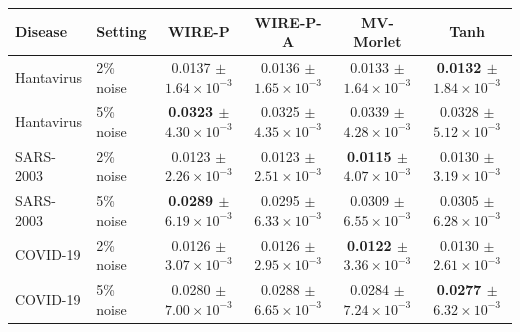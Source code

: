 \begin{tabular}{llcccc}
\toprule
Disease & Setting & WIRE-P & WIRE-P-A & MV-Morlet & Tanh \\
\midrule
Hantavirus & 2\% noise & 0.0137 $\pm$ $1.64\times10^{-3}$ & 0.0136 $\pm$ $1.65\times10^{-3}$ & 0.0133 $\pm$ $1.64\times10^{-3}$ & \textbf{0.0132 $\pm$ $1.84\times10^{-3}$} \\
Hantavirus & 5\% noise & \textbf{0.0323 $\pm$ $4.30\times10^{-3}$} & 0.0325 $\pm$ $4.35\times10^{-3}$ & 0.0339 $\pm$ $4.28\times10^{-3}$ & 0.0328 $\pm$ $5.12\times10^{-3}$ \\
SARS-2003 & 2\% noise & 0.0123 $\pm$ $2.26\times10^{-3}$ & 0.0123 $\pm$ $2.51\times10^{-3}$ & \textbf{0.0115 $\pm$ $4.07\times10^{-3}$} & 0.0130 $\pm$ $3.19\times10^{-3}$ \\
SARS-2003 & 5\% noise & \textbf{0.0289 $\pm$ $6.19\times10^{-3}$} & 0.0295 $\pm$ $6.33\times10^{-3}$ & 0.0309 $\pm$ $6.55\times10^{-3}$ & 0.0305 $\pm$ $6.28\times10^{-3}$ \\
COVID-19 & 2\% noise & 0.0126 $\pm$ $3.07\times10^{-3}$ & 0.0126 $\pm$ $2.95\times10^{-3}$ & \textbf{0.0122 $\pm$ $3.36\times10^{-3}$} & 0.0130 $\pm$ $2.61\times10^{-3}$ \\
COVID-19 & 5\% noise & 0.0280 $\pm$ $7.00\times10^{-3}$ & 0.0288 $\pm$ $6.65\times10^{-3}$ & 0.0284 $\pm$ $7.24\times10^{-3}$ & \textbf{0.0277 $\pm$ $6.32\times10^{-3}$} \\
\bottomrule
\end{tabular}